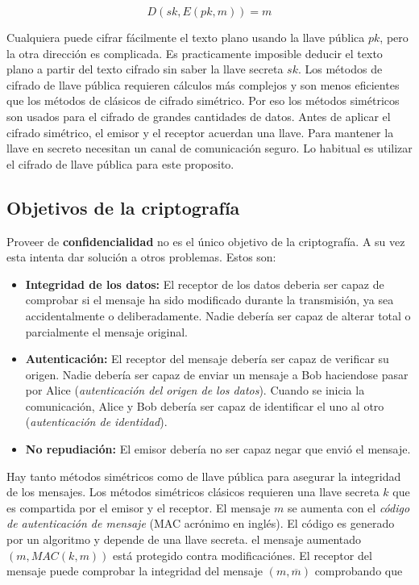 \documentclass[12pt]{article}
\theoremstyle{definition}
\begin{document}
$$D(sk,E(pk,m))=m$$

Cualquiera puede cifrar fácilmente el texto plano usando la llave pública $pk$, pero la otra dirección es complicada. Es practicamente imposible deducir el texto plano a partir del texto cifrado sin saber la llave secreta $sk$.
\newline
\newline
Los métodos de cifrado de llave pública requieren cálculos más complejos y son menos eficientes que los métodos de clásicos de cifrado simétrico. Por eso los métodos simétricos son usados para el cifrado de grandes cantidades de datos. Antes de aplicar el cifrado simétrico, el emisor y el receptor acuerdan una llave. Para mantener la llave en secreto necesitan un canal de comunicación seguro. Lo habitual es utilizar el cifrado de llave pública para este proposito.

\subsection{Objetivos de la criptografía}

Proveer de \textbf{confidencialidad} no es el único objetivo de la criptografía. A su vez esta intenta dar solución a otros problemas. Estos son:

\begin{itemize}
\item \textbf{Integridad de los datos:} El receptor de los datos deberia ser capaz de comprobar si el mensaje ha sido modificado durante la transmisión, ya sea accidentalmente o deliberadamente. Nadie debería ser capaz de alterar total o parcialmente el mensaje original.

\item \textbf{Autenticación:} El receptor del mensaje debería ser capaz de verificar su origen. Nadie debería ser capaz de enviar un mensaje a Bob haciendose pasar por Alice (\textit{autenticación del origen de los datos}). Cuando se inicia la comunicación, Alice y Bob debería ser capaz de identificar el uno al otro (\textit{autenticación de identidad}).

\item \textbf{No repudiación:} El emisor debería no ser capaz negar que envió el mensaje.
\end{itemize}

Hay tanto métodos simétricos como de llave pública para asegurar la integridad de los mensajes. Los métodos simétricos clásicos requieren una llave secreta $k$ que es compartida por el emisor y el receptor. El mensaje $m$ se aumenta con el \textit{código de autenticación de mensaje} (MAC acrónimo en inglés). El código es generado por un algoritmo y depende de una llave secreta. el mensaje aumentado $(m,MAC(k,m))$ está protegido contra modificaciónes. El receptor del mensaje puede comprobar la integridad del mensaje $(m,\overline{m})$ comprobando que
\end{document}
